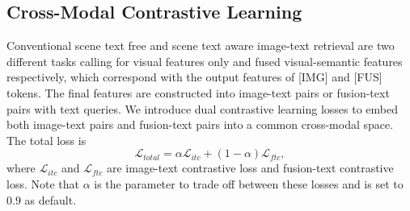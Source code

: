 \documentclass[10pt,twocolumn,letterpaper]{article}
\begin{document}
\begin{table*}[thb]
\centering
\begin{threeparttable}
\caption{Comparisons with the state-of-the-art scene text aware approaches on CTC.}\vspace{-0.5em}
\label{Tab-scene-IRTR}

\footnotesize
{}
\end{threeparttable}
\end{table*}

\subsection{Cross-Modal Contrastive Learning}
\label{Cross-Modal Contrastive Learning}

Conventional scene text free and scene text aware image-text retrieval are two different tasks calling for visual features only and fused visual-semantic features respectively, which correspond with the output features of [IMG] and [FUS] tokens. The final features are constructed into image-text pairs or fusion-text pairs with text queries. 
We introduce dual contrastive learning losses to embed both image-text pairs and fusion-text pairs into a common cross-modal space.
The total loss is
\begin{equation}
    \mathcal{L}_{total} = \alpha \mathcal{L}_{itc} + (1-\alpha) \mathcal{L}_{ftc},
\end{equation}
where $\mathcal{L}_{itc}$ and $\mathcal{L}_{ftc}$ are image-text contrastive loss and fusion-text contrastive loss. Note that $\alpha$ is the parameter to trade off between these losses and is set to $0.9$ as default. 
\end{document}
